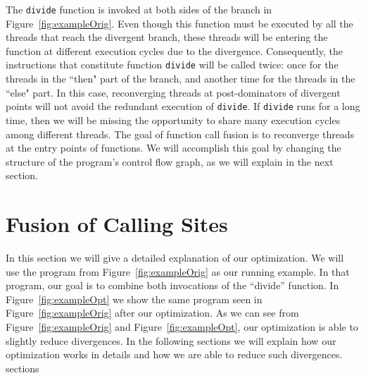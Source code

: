 \documentclass[times,10pt,twocolumn]{article}
\begin{document}
The \texttt{divide} function is invoked at both sides of the branch in
Figure~\ref{fig:exampleOrig}.
Even though this function must be executed by all the threads that reach the
divergent branch, these threads will be entering the function at different
execution cycles due to the divergence.
Consequently, the instructions that constitute function \texttt{divide} will
be called twice: once for the threads in the ``then" part of the branch, and
another time for the threads in the ``else" part.
In this case, reconverging threads at post-dominators of divergent points will
not avoid the redundant execution of \texttt{divide}.
If \texttt{divide} runs for a long time, then we will be missing the
opportunity to share many execution cycles among different threads.
The goal of function call fusion is to reconverge threads at the entry points
of functions.
We will accomplish this goal by changing the structure of the program's
control flow graph, as we will explain in the next section.

\section{Fusion of Calling Sites}
\label{sec:sol}

In this section we will give a detailed explanation of our optimization. 
We will use the program from Figure~\ref{fig:exampleOrig} as our running
example.
In that program, our goal is to combine both invocations of the ``divide''
function.
In Figure~\ref{fig:exampleOpt} we show the same program seen in 
Figure~\ref{fig:exampleOrig} after our optimization.
As we can see from Figure~\ref{fig:exampleOrig} and Figure~\ref{fig:exampleOpt},
our optimization is able to slightly reduce divergences.
In the following sections we will explain how our optimization works in details
and how we are able to reduce such divergences.
sections
\end{document}
